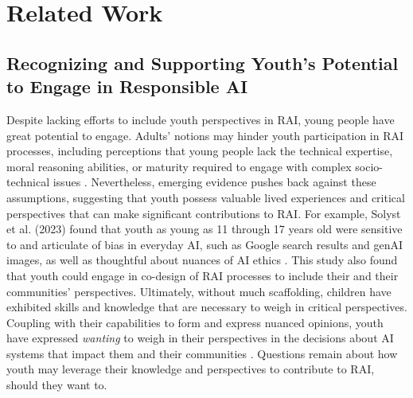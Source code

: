 \section{Related Work}

\subsection{Recognizing and Supporting Youth’s Potential to Engage in Responsible AI}
Despite lacking efforts to include youth perspectives in RAI, young people have great potential to engage. Adults’ notions may hinder youth participation in RAI processes, including perceptions that young people lack the technical expertise, moral reasoning abilities, or maturity required to engage with complex socio-technical issues \cite{solyst2023potential}. Nevertheless, emerging evidence pushes back against these assumptions, suggesting that youth possess valuable lived experiences and critical perspectives that can make significant contributions to RAI. For example, Solyst et al. (2023) found that youth as young as 11 through 17 years old were sensitive to and articulate of bias in everyday AI, such as Google search results and genAI images, as well as thoughtful about nuances of AI ethics \cite{solyst2023potential}. This study also found that youth could engage in co-design of RAI processes to include their and their communities’ perspectives. Ultimately, without much scaffolding, children have exhibited skills and knowledge that are necessary to weigh in critical perspectives. Coupling with their capabilities to form and express nuanced opinions, youth have expressed \emph{wanting} to weigh in their perspectives in the decisions about AI systems that impact them and their communities \cite{solyst2023would, wang2023treat}. Questions remain about how youth may leverage their knowledge and perspectives to contribute to RAI, should they want to.

